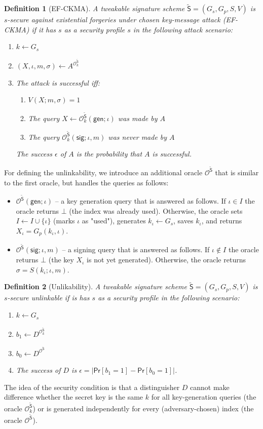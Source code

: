 \documentclass{article}
\newtheorem{definition}{Definition}[section]
\begin{document}
\begin{definition}[EF-CKMA]
A tweakable signature scheme $\tilde{\mathsf{S}}=(G_s,G_p,S,V)$ is $s$-secure against existential forgeries under
chosen key-message attack (EF-CKMA) if it has $s$ as a security profile $s$ in the following attack scenario:
\begin{enumerate}
\item $k\gets G_s$
\item $(X,\iota,m,\sigma)\gets A^{\mathcal{O}^{\tilde{\mathsf{S}}}_k}$
\item The attack is successful iff:
\begin{enumerate}
\item $V(X;m,\sigma)=1$
\item The query $X\gets \mathcal{O}^{\tilde{\mathsf{S}}}_k(\mathsf{gen};\iota)$ was made by $A$
\item The query $\mathcal{O}^{\tilde{\mathsf{S}}}_k(\mathsf{sig};\iota,m)$ was never made by $A$
\end{enumerate}
The success $\epsilon$ of $A$ is the probability that $A$ is successful.
\end{enumerate}
\end{definition}
For defining the unlinkability, we introduce an additional oracle $\mathcal{O}^{\tilde{\mathsf{S}}}$ that is similar to the first oracle, but handles the
queries as follows:
\begin{itemize}
\item $\mathcal{O}^{\tilde{\mathsf{S}}}(\mathsf{gen};\iota)$ -- a key generation query that is answered as follows. If $\iota\in I$ the  oracle returns $\bot$ (the index was already used). Otherwise, the oracle sets $I\gets I\cup \{\iota\}$ (marks $\iota$ as "used"), generates $k_\iota\gets G_s$, saves $k_\iota$, and returns $X_\iota = G_p(k_\iota,\iota)$.
\item $\mathcal{O}^{\tilde{\mathsf{S}}}(\mathsf{sig};\iota,m)$ -- a signing query that is answered as follows. If $\iota\not\in I$ the  oracle returns $\bot$ (the key $X_\iota$ is not yet generated). Otherwise, the oracle returns $\sigma=S(k_\iota;\iota,m)$.
\end{itemize}
\begin{definition}[Unlikability]\label{def:unlinkability}
A tweakable signature scheme $\tilde{\mathsf{S}}=(G_s,G_p,S,V)$ is $s$-secure unlinkable if is has $s$ as a security profile in the following scenario:
\begin{enumerate}
\item $k\gets G_s$
\item $b_1\gets D^{\mathcal{O}^{\tilde{\mathsf{S}}}_k}$
\item $b_0\gets D^{\mathcal{O}^{\tilde{\mathsf{S}}}}$
\item The success of $D$ is
$\epsilon=|\mathsf{Pr}[b_1=1]-\mathsf{Pr}[b_0=1]|$.
\end{enumerate}
\end{definition}
The idea of the security condition is that a distinguisher $D$ cannot make difference whether the secret key is the same $k$ for all key-generation queries (the oracle $\mathcal{O}^{\tilde{\mathsf{S}}}_k$)
or is generated independently for every (adversary-chosen) index (the oracle $\mathcal{O}^{\tilde{\mathsf{S}}}$).
\end{document}

